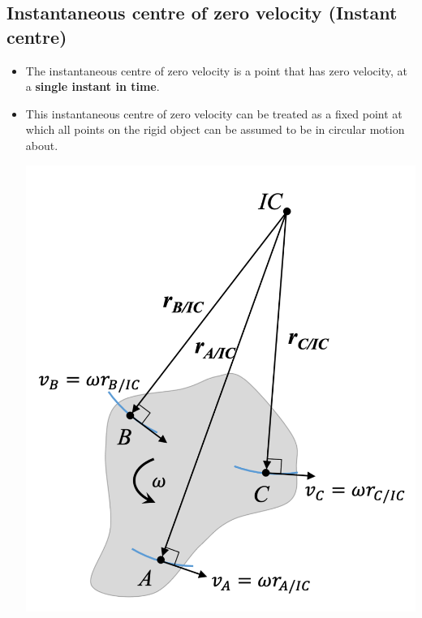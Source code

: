 \documentclass[11pt]{article}
\begin{document}
\subsection{Instantaneous centre of zero velocity (Instant centre)}
\label{sec:org3fa3d48}
\begin{itemize}
\item The instantaneous centre of zero velocity is a point that has zero velocity, at a \textbf{single instant in time}.
\item This instantaneous centre of zero velocity can be treated as a fixed point at which all points on the rigid object can be assumed to be in circular motion about.
\begin{center}
\includegraphics[width=.9\linewidth]{./images/instantaneous-centre-as-centre-of-rotation.png}
\end{center}
\end{itemize}

 \newpage
\end{document}
